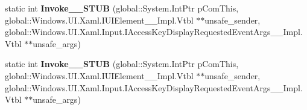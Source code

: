 \begin{DoxyCompactItemize}
static int {\bfseries Invoke\+\_\+\+\_\+\+S\+T\+UB} (global\+::\+System.\+Int\+Ptr p\+Com\+This, global\+::\+Windows.\+U\+I.\+Xaml.\+I\+U\+I\+Element\+\_\+\+\_\+\+Impl.\+Vtbl $\ast$$\ast$unsafe\+\_\+sender, global\+::\+Windows.\+U\+I.\+Xaml.\+Input.\+I\+Access\+Key\+Display\+Requested\+Event\+Args\+\_\+\+\_\+\+Impl.\+Vtbl $\ast$$\ast$unsafe\+\_\+args)
\item 
\mbox{\label{struct_windows_1_1_foundation_1_1_typed_event_handler___a___windows___u_i___xaml___u_i_element__0a74a57359b62166d706be96094573e6_a4f9fee64af9b879c41860ee2f5505676}} 
static int {\bfseries Invoke\+\_\+\+\_\+\+S\+T\+UB} (global\+::\+System.\+Int\+Ptr p\+Com\+This, global\+::\+Windows.\+U\+I.\+Xaml.\+I\+U\+I\+Element\+\_\+\+\_\+\+Impl.\+Vtbl $\ast$$\ast$unsafe\+\_\+sender, global\+::\+Windows.\+U\+I.\+Xaml.\+Input.\+I\+Access\+Key\+Display\+Requested\+Event\+Args\+\_\+\+\_\+\+Impl.\+Vtbl $\ast$$\ast$unsafe\+\_\+args)
\end{DoxyCompactItemize}
